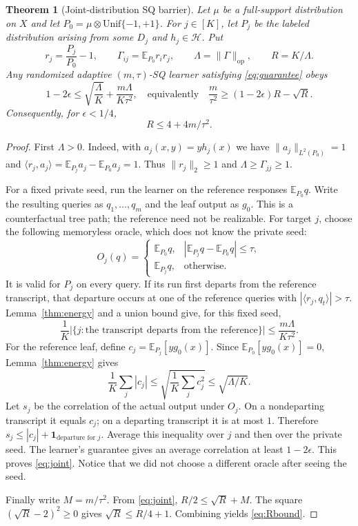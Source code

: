 \documentclass[11pt]{article}
\newtheorem{theorem}{Theorem}
\newcommand{\E}{\mathbb E}
\newcommand{\1}{\mathbf 1}
\newcommand{\cH}{\mathcal H}
\newcommand{\op}{\mathrm{op}}
\begin{document}
\begin{samepage}
\begin{theorem}[Joint-distribution SQ barrier]\label{thm:barrier}
Let $\mu$ be a full-support distribution on $X$ and let $P_0=\mu\otimes\mathrm{Unif}\{-1,+1\}$. For $j\in[K]$, let $P_j$ be the labeled distribution arising from some $D_j$ and $h_j\in\cH$. Put
\[
 r_j=\frac{P_j}{P_0}-1,\qquad
 \Gamma_{ij}=\E_{P_0}r_i r_j,\qquad
 \Lambda=\|\Gamma\|_\op,\qquad R=K/\Lambda.
\]
Any randomized adaptive $(m,\tau)$-SQ learner satisfying \eqref{eq:guarantee} obeys
\begin{equation}\label{eq:joint}
 1-2\epsilon\leq\sqrt{\frac\Lambda K}+
 \frac{m\Lambda}{K\tau^2},
 \quad\text{equivalently}\quad
 \frac m{\tau^2}\geq(1-2\epsilon)R-\sqrt R.
\end{equation}
Consequently, for $\epsilon<1/4$,
\begin{equation}\label{eq:Rbound}
 R\leq4+4m/\tau^2.
\end{equation}
\end{theorem}
\end{samepage}
\begin{proof}
First $\Lambda>0$. Indeed, with $a_j(x,y)=y h_j(x)$ we have $\|a_j\|_{L^2(P_0)}=1$ and
$\langle r_j,a_j\rangle=\E_{P_j}a_j-\E_{P_0}a_j=1$. Thus $\|r_j\|_2\geq1$ and $\Lambda\geq\Gamma_{jj}\geq1$.

For a fixed private seed, run the learner on the reference responses $\E_{P_0}q$. Write the resulting queries as $q_1,\ldots,q_m$ and the leaf output as $g_0$. This is a counterfactual tree path; the reference need not be realizable. For target $j$, choose the following memoryless oracle, which does not know the private seed:
\[
 O_j(q)=
 \begin{cases}
 \E_{P_0}q,&|\E_{P_j}q-\E_{P_0}q|\leq\tau,\\
 \E_{P_j}q,&\text{otherwise}.
 \end{cases}
\]
It is valid for $P_j$ on every query. If its run first departs from the reference transcript, that departure occurs at one of the reference queries with $|\langle r_j,q_t\rangle|>\tau$. Lemma~\ref{thm:energy} and a union bound give, for this fixed seed,
\[
 \frac1K\bigl|\{j:\text{the transcript departs from the reference}\}\bigr|
 \leq\frac{m\Lambda}{K\tau^2}.
\]
For the reference leaf, define $c_j=\E_{P_j}[y g_0(x)]$. Since $\E_{P_0}[y g_0(x)]=0$, Lemma~\ref{thm:energy} gives
\[
 \frac1K\sum_j|c_j|\leq
 \sqrt{\frac1K\sum_jc_j^2}\leq\sqrt{\Lambda/K}.
\]
Let $s_j$ be the correlation of the actual output under $O_j$. On a nondeparting transcript it equals $c_j$; on a departing transcript it is at most $1$. Therefore
$s_j\leq|c_j|+\1_{\text{departure for }j}$.
Average this inequality over $j$ and then over the private seed. The learner's guarantee gives an average correlation at least $1-2\epsilon$. This proves \eqref{eq:joint}. Notice that we did not choose a different oracle after seeing the seed.

Finally write $M=m/\tau^2$. From \eqref{eq:joint}, $R/2\leq\sqrt R+M$. The square $(\sqrt R-2)^2\geq0$ gives $\sqrt R\leq R/4+1$. Combining yields \eqref{eq:Rbound}.
\end{proof}
\end{document}
